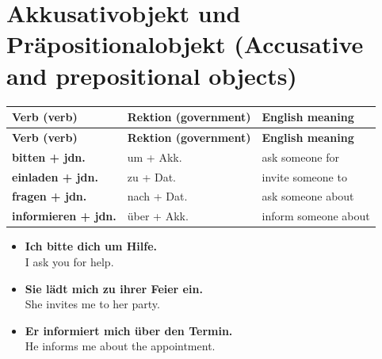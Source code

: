 \documentclass[a4paper,11pt]{article}
\newcommand{\ExampleItem}[2]{\item \textbf{#1}\\{\small\color{SoftGray}#2}}
\begin{document}
\section{Akkusativobjekt und Präpositionalobjekt (Accusative and prepositional objects)}
\begin{longtable}{>{\raggedright\arraybackslash}p{} >{\raggedright\arraybackslash}p{} >{\raggedright\arraybackslash}p{}}
\rowcolor{HeaderBlueDark}
\color{white}\textbf{Verb (verb)} & \color{white}\textbf{Rektion (government)} & \color{white}\textbf{English meaning}\\
\endfirsthead
\rowcolor{HeaderBlueDark}
\color{white}\textbf{Verb (verb)} & \color{white}\textbf{Rektion (government)} & \color{white}\textbf{English meaning}\\
\endhead
\textbf{bitten + jdn.} & um + Akk. & ask someone for\\
\textbf{einladen + jdn.} & zu + Dat. & invite someone to\\
\textbf{fragen + jdn.} & nach + Dat. & ask someone about\\
\textbf{informieren + jdn.} & über + Akk. & inform someone about\\
\end{longtable}
\begin{exbox}
\begin{itemize}
\ExampleItem{Ich bitte dich um Hilfe.}{I ask you for help.}
\ExampleItem{Sie lädt mich zu ihrer Feier ein.}{She invites me to her party.}
\ExampleItem{Er informiert mich über den Termin.}{He informs me about the appointment.}
\end{itemize}
\end{exbox}
\end{document}
